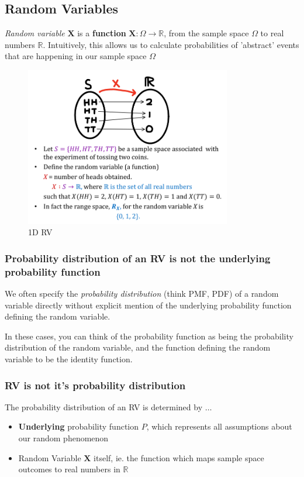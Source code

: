 \documentclass{article}
\begin{document}
\subsection{Random Variables}
\textit{Random variable} $\boldsymbol{X}$ is a \textbf{function} $\boldsymbol{X}:\Omega \rightarrow \mathds{R}$, from the sample space $\Omega$ to real numbers $\mathds{R}$.
Intuitively, this allows us to calculate probabilities of 'abstract' events that are happening in our sample space $\Omega$

\begin{figure}[htp]
    \centering
    \includegraphics[width=9cm, scale=1]{images/1D_RV.PNG}
    \captionsetup{justification=centering}
    \caption{1D RV}
\end{figure}

\subsubsection{Probability distribution of an RV is not the underlying probability function}
We often specify the \textit{probability distribution} (think PMF, PDF) of a random variable directly without explicit mention of the underlying probability function defining the random variable.

In these cases, you can think of the probability function as being the probability distribution of the random variable, 
and the function defining the random variable to be the identity function.

\subsubsection{RV is not it's probability distribution}
The probability distribution of an RV is determined by $\dots$
\begin{itemize}
    \item \textbf{Underlying} probability function $P$, which represents all assumptions about our random phenomenon
    \item Random Variable $\boldsymbol{X}$ itself, ie. the function which maps sample space outcomes to real numbers in $\mathds{R}$
\end{itemize}\vspace{0.25cm}
\end{document}
